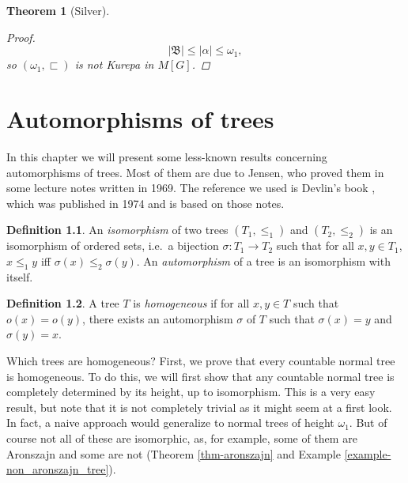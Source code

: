 \documentclass[11pt,a4paper]{report}
\newtheorem{theorem}{Theorem}[chapter] %
\theoremstyle{definition}
\newtheorem{defn}[theorem]{Definition}
\theoremstyle{num.custom-title}
\theoremstyle{custom-title}
\begin{document}
\begin{theorem}[Silver]
\begin{proof}
\[
|\mathfrak{B}| \leq |\alpha| \leq \omega_1,
\]
so $(\omega_1,\sqsubset)$ is not Kurepa in $M[G]$.
\end{proof}
\end{theorem}



\chapter{Automorphisms of trees}
\label{chapter-automorphisms_of_trees}

In this chapter we will present some less-known results concerning automorphisms of trees. Most of them are due to Jensen, who proved them in some lecture notes written in 1969. The reference we used is Devlin's book \cite{Dev1974}, which was published in 1974 and is based on those notes.

\begin{defn}
An \emph{isomorphism} of two trees $(T_1,\leq_1)$ and $(T_2,\leq_2)$ is an isomorphism of ordered sets, i.e.\ a bijection $\sigma \colon T_1 \to T_2$ such that for all $x,y \in T_1$, $x \leq_1 y$ iff $\sigma(x) \leq_2 \sigma(y)$. An \emph{automorphism} of a tree is an isomorphism with itself.
\end{defn}

\begin{defn}
A tree $T$ is \emph{homogeneous} if for all $x,y \in T$ such that $o(x)=o(y)$, there exists an automorphism $\sigma$ of $T$ such that $\sigma(x)=y$ and $\sigma(y)=x$.
\end{defn}

Which trees are homogeneous? First, we prove that every countable normal tree is homogeneous. To do this, we will first show that any countable normal tree is completely determined by its height, up to isomorphism. This is a very easy result, but note that it is not completely trivial as it might seem at a first look. In fact, a naive approach would generalize to normal trees of height $\omega_1$. But of course not all of these are isomorphic, as, for example, some of them are Aronszajn and some are not (Theorem \ref{thm-aronszajn} and Example \ref{example-non_aronszajn_tree}).
\end{document}
